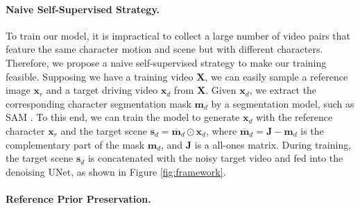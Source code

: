 \paragraph{Naive Self-Supervised Strategy.}
To train our model, it is impractical to collect a large number of video pairs that feature the same character motion and scene but with different characters. 
Therefore, we propose a naive self-supervised strategy to make our training feasible.
Supposing we have a training video $\boldsymbol{X}$, we can easily sample a reference image $\boldsymbol{x}_r$ and a target driving video $\boldsymbol{x}_d$ from $\boldsymbol{X}$.
Given $\boldsymbol{x}_d$, we extract the corresponding character segmentation mask $\boldsymbol{m}_d$ by a segmentation model, such as SAM \cite{kirillov2023segment}.
To this end, we can train the model to generate $\boldsymbol{x}_d$ with the reference character $\boldsymbol{x}_r$ and the target scene $\boldsymbol{s}_d = \overline{\boldsymbol{m}}_d \odot \boldsymbol{x}_d$, where $\overline{\boldsymbol{m}}_d=\boldsymbol{J}-\boldsymbol{m}_d$ is the complementary part of the mask $\boldsymbol{m}_d$, and $\boldsymbol{J}$ is a all-ones matrix.
During training, the target scene $\boldsymbol{s}_d$ is concatenated with the noisy target video and fed into the denoising UNet, as shown in Figure \ref{fig:framework}.


\paragraph{Reference Prior Preservation.}

